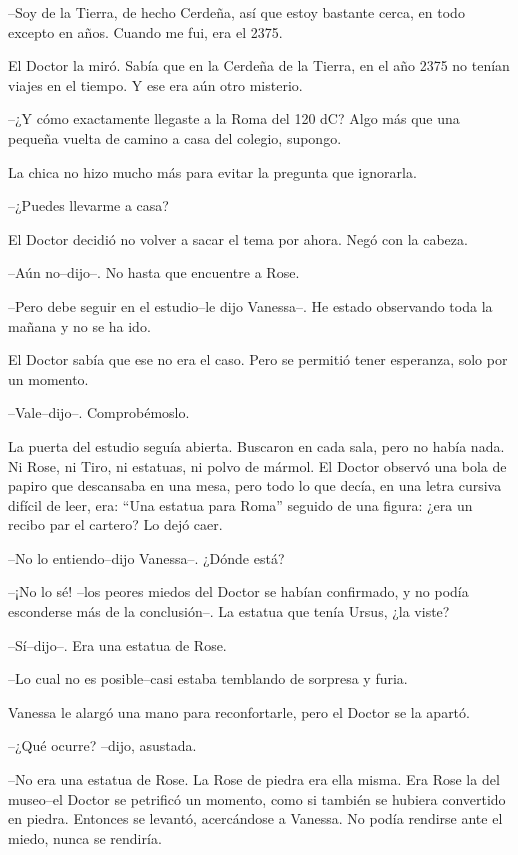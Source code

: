 --Soy de la Tierra, de hecho Cerdeña, así que estoy bastante cerca, en
todo excepto en años. Cuando me fui, era el 2375.

El Doctor la miró. Sabía que en la Cerdeña de la Tierra, en el año 2375
no tenían viajes en el tiempo. Y ese era aún otro misterio.

--¿Y cómo exactamente llegaste a la Roma del 120 dC? Algo más que una
pequeña vuelta de camino a casa del colegio, supongo.

La chica no hizo mucho más para evitar la pregunta que ignorarla.

--¿Puedes llevarme a casa?

El Doctor decidió no volver a sacar el tema por ahora. Negó con la
cabeza.

--Aún no--dijo--. No hasta que encuentre a Rose.

--Pero debe seguir en el estudio--le dijo Vanessa--. He estado
observando toda la mañana y no se ha ido.

El Doctor sabía que ese no era el caso. Pero se permitió tener
esperanza, solo por un momento.

--Vale--dijo--. Comprobémoslo.

La puerta del estudio seguía abierta. Buscaron en cada sala, pero no
había nada. Ni Rose, ni Tiro, ni estatuas, ni polvo de mármol. El Doctor
observó una bola de papiro que descansaba en una mesa, pero todo lo que
decía, en una letra cursiva difícil de leer, era: ``Una estatua para
Roma'' seguido de una figura: ¿era un recibo par el cartero? Lo dejó
caer.

--No lo entiendo--dijo Vanessa--. ¿Dónde está?

--¡No lo sé! --los peores miedos del Doctor se habían confirmado, y no
podía esconderse más de la conclusión--. La estatua que tenía Ursus, ¿la
viste?

--Sí--dijo--. Era una estatua de Rose.

--Lo cual no es posible--casi estaba temblando de sorpresa y furia.

Vanessa le alargó una mano para reconfortarle, pero el Doctor se la
apartó.

--¿Qué ocurre? --dijo, asustada.

--No era una estatua de Rose. La Rose de piedra era ella misma. Era Rose
la del museo--el Doctor se petrificó un momento, como si también se
hubiera convertido en piedra. Entonces se levantó, acercándose a
Vanessa. No podía rendirse ante el miedo, nunca se rendiría.

